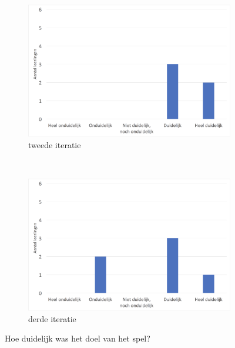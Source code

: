 \documentclass[11pt]{article}
\begin{document}
\begin{figure}
	\centering
    \begin{subfigure}[b]{0.48\textwidth}
        \includegraphics[width=\textwidth]{pictures/2_DoelSpel.png}
        \caption{tweede iteratie}
        \label{doel:spel:twee}
    \end{subfigure}
    ~
    \begin{subfigure}[b]{0.48\textwidth}
        \includegraphics[width=\textwidth]{pictures/3_DoelSpel.png}
        \caption{derde iteratie}
        \label{doel:spel:drie}
    \end{subfigure}
    \caption{Hoe duidelijk was het doel van het spel?}\label{doel:spel}
\end{figure}
\end{document}
